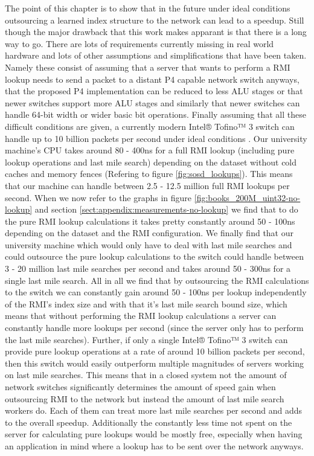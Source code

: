 The point of this chapter is to show that in the future under ideal conditions outsourcing a learned index structure to the network can lead to a speedup. Still though the major drawback that this work makes apparant is that there is a long way to go. There are lots of requirements currently missing in real world hardware and lots of other assumptions and simplifications that have been taken. Namely these consist of assuming that a server that wants to perform a RMI lookup needs to send a packet to a distant P4 capable network switch anyways, that the proposed P4 implementation can be reduced to less ALU stages or that newer switches support more ALU stages and similarly that newer switches can handle 64-bit width or wider basic bit operations. Finally assuming that all these difficult conditions are given, a currently modern Intel® Tofino™ 3 switch can handle up to 10 billion packets per second under ideal conditions \cite{tofino3-brief}. Our university machine's CPU takes around 80 - 400ns for a full RMI lookup (including pure lookup operations and last mile search) depending on the dataset without cold caches and memory fences (Refering to figure \ref{fig:sosd_lookups}). This means that our machine can handle between 2.5 - 12.5 million full RMI lookups per second. When we now refer to the graphs in figure \ref{fig:books_200M_uint32-no-lookup} and section \ref{sect:appendix:measurements-no-lookup} we find that to do the pure RMI lookup calculations it takes pretty constantly around 50 - 100ns depending on the dataset and the RMI configuration. We finally find that our university machine which would only have to deal with last mile searches and could outsource the pure lookup calculations to the switch could handle between 3 - 20 million last mile searches per second and takes around 50 - 300ns for a single last mile search. All in all we find that by outsourcing the RMI calculations to the switch we can constantly gain around 50 - 100ns per lookup independently of the RMI's index size and with that it's last mile search bound size, which means that without performing the RMI lookup calculations a server can constantly handle more lookups per second (since the server only has to perform the last mile searches). Further, if only a single Intel® Tofino™ 3 switch can provide pure lookup operations at a rate of around 10 billion packets per second, then this switch would easily outperform multiple magnitudes of servers working on last mile searches. This means that in a closed system not the amount of network switches significantly determines the amount of speed gain when outsourcing RMI to the network but instead the amount of last mile search workers do. Each of them can treat more last mile searches per second and adds to the overall speedup. Additionally the constantly less time not spent on the server for calculating pure lookups would be mostly free, especially when having an application in mind where a lookup has to be sent over the network anyways.\\


